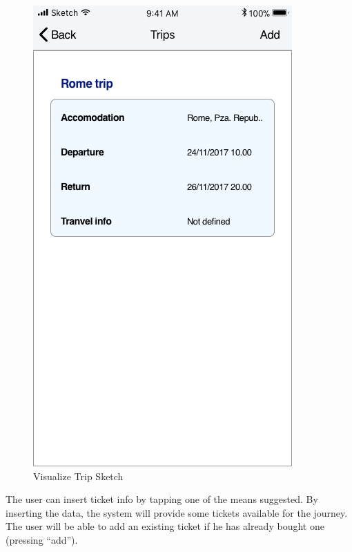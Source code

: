 \begin{figure}[H]
	\includegraphics[scale=0.23]{Images/Interface/Trips/6_trip_list}
	\caption{Visualize Trip Sketch}
\end{figure}
The user can insert ticket info by tapping one of the means suggested. By inserting the data, the system will provide some tickets available for the journey. The user will be able to add an existing ticket if he has already bought one (pressing “add”).
